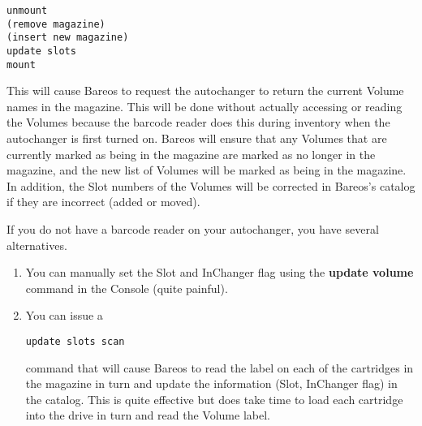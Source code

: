 \footnotesize
\begin{verbatim}
unmount
(remove magazine)
(insert new magazine)
update slots
mount
\end{verbatim}
\normalsize

This will cause Bareos to request the autochanger to
return the current Volume names in the magazine. This will be done without
actually accessing or reading the Volumes because the barcode reader does this
during inventory when the autochanger is first turned on. Bareos will ensure
that any Volumes that are currently marked as being in the magazine are marked
as no longer in the magazine, and the new list of Volumes will be marked as
being in the magazine. In addition, the Slot numbers of the Volumes will be
corrected in Bareos's catalog if they are incorrect (added or moved).

If you do not have a barcode reader on your autochanger, you have several
alternatives.

\begin{enumerate}
\item You can manually set the Slot and InChanger flag using  the {\bf update
   volume} command in the Console (quite  painful).

\item You can issue a

\footnotesize
\begin{verbatim}
update slots scan
\end{verbatim}
\normalsize

   command that will cause Bareos to read the label on each  of the cartridges in
   the magazine in turn and update the  information (Slot, InChanger flag) in the
   catalog. This  is quite effective but does take time to load each cartridge
   into the drive in turn and read the Volume label.

\end{enumerate}

